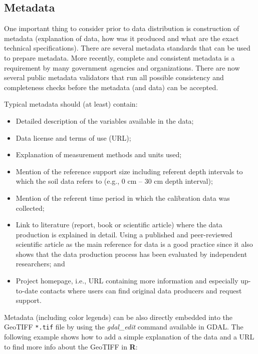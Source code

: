 \documentclass[10pt,b5paper,]{book}
\providecommand{\tightlist}{%
  \setlength{\itemsep}{0pt}\setlength{\parskip}{0pt}}
\theoremstyle{definition}
\theoremstyle{definition}
\theoremstyle{definition}
\theoremstyle{remark}
\begin{document}
\hypertarget{metadata}{%
\subsection{Metadata}\label{metadata}}

One important thing to consider prior to data distribution is
construction of metadata (explanation of data, how was it produced and
what are the exact technical specifications). There are several metadata
standards that can be used to prepare metadata. More recently, complete
and consistent metadata is a requirement by many government agencies and
organizations. There are now several public metadata validators that run
all possible consistency and completeness checks before the metadata
(and data) can be accepted.

Typical metadata should (at least) contain:

\begin{itemize}
\tightlist
\item
  Detailed description of the variables available in the data;
\item
  Data license and terms of use (URL);
\item
  Explanation of measurement methods and units used;
\item
  Mention of the reference support size including referent depth
  intervals to which the soil data refers to (e.g., 0 cm -- 30 cm depth
  interval);
\item
  Mention of the referent time period in which the calibration data was
  collected;
\item
  Link to literature (report, book or scientific article) where the data
  production is explained in detail. Using a published and peer-reviewed
  scientific article as the main reference for data is a good practice
  since it also shows that the data production process has been
  evaluated by independent researchers; and
\item
  Project homepage, i.e., URL containing more information and especially
  up-to-date contacts where users can find original data producers and
  request support.
\end{itemize}

Metadata (including color legends) can be also directly embedded into
the GeoTIFF \texttt{*.tif} file by using the \emph{gdal\_edit} command
available in GDAL. The following example shows how to add a simple
explanation of the data and a URL to find more info about the GeoTIFF in
\textbf{R}:
\end{document}
